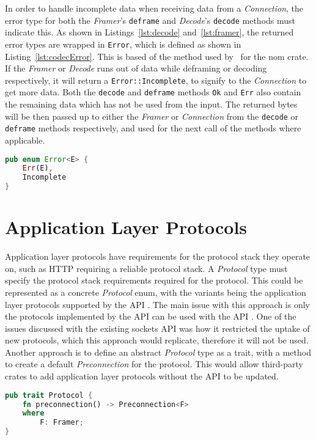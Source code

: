 \documentclass{l4proj}
\begin{document}
In order to handle incomplete data when receiving data from a \emph{Connection}, the error type for both the
\emph{Framer}'s \texttt{deframe} and \emph{Decode}'s \texttt{decode} methods must indicate this.
As shown in Listings~\ref{lst:decode} and~\ref{lst:framer}, the returned error types are wrapped in \texttt{Error},
which is defined as shown in Listing~\ref{lst:codecError}.
This is based of the method used by~\cite{geal_nomerr_nodate} for the nom crate.
If the \emph{Framer} or \emph{Decode} runs out of data while deframing or decoding respectively, it will return a
\texttt{Error::Incomplete}, to signify to the \emph{Connection} to get more data.
Both the \texttt{decode} and \texttt{deframe} methods \texttt{Ok} and \texttt{Err} also contain the remaining data which
has not be used from the input.
The returned bytes will be then passed up to either the \emph{Framer} or \emph{Connection} from the \texttt{decode} or
\texttt{deframe} methods respectively, and used for the next call of the methods where applicable.

\begin{lstlisting}[language=Rust, float=h, label=lst:codecError, caption={The Error type for deframe and decode methods,
    showing the Incomplete varient.}]
pub enum Error<E> {
    Err(E),
    Incomplete
}
\end{lstlisting}

\section{Application Layer Protocols}
Application layer protocols have requirements for the protocol stack they operate on, such as HTTP requiring a reliable
protocol stack.
A \emph{Protocol} type must specify the protocol stack requirements required for the protocol.
This could be represented as a concrete \emph{Protocol} enum, with the variants being the application layer protocols
supported by the API .
The main issue with this approach is only the protocols implemented by the API can be used with the API .
One of the issues discussed with the existing sockets API was how it restricted the uptake of new protocols, which this
approach would replicate, therefore it will not be used.
Another approach is to define an abstract \emph{Protocol} type as a trait, with a method to create a default
\emph{Preconnection} for the protocol.
This would allow third-party crates to add application layer protocols without the API to be updated.

\begin{lstlisting}[language=Rust, float=h, label=lst:protocol, caption={The Protocol trait, add more info here}]
pub trait Protocol {
    fn preconnection() -> Preconnection<F>
    where
        F: Framer;
}
\end{lstlisting}
\end{document}

